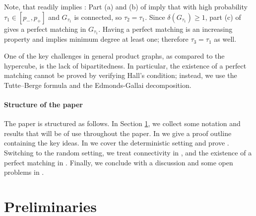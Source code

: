 \documentclass[notitlepage]{scrartcl}
\begin{document}
Note, that  readily implies : Part (a) and (b) of  imply that with high probability $\tau_1\in[p_-,p_+]$ and $G_{\tau_1}$ is connected, so $\tau_2=\tau_1$.
Since $\delta(G_{\tau_1})\ge1$, part (c) of  gives a perfect matching in $G_{\tau_1}$.
Having a perfect matching is an increasing property and implies minimum degree at least one; therefore $\tau_3=\tau_1$ as well.

One of the key challenges in general product graphs, as compared to the hypercube, is the lack of bipartitedness. In particular, the existence of a perfect matching cannot be proved by verifying Hall's condition; instead, we use the Tutte--Berge formula and the Edmonds-Gallai decomposition. %

\paragraph{Structure of the paper}

The paper is structured as follows. In Section \ref{s:prelim}, we collect some notation and results that will be of use throughout the paper. In  we give a proof outline containing the key ideas. In  we cover the deterministic setting and prove . Switching to the random setting, we treat connectivity in , and the existence of a perfect matching in . Finally, we conclude with a discussion and some open problems in .

\section{Preliminaries}\label{s:prelim}
\end{document}
